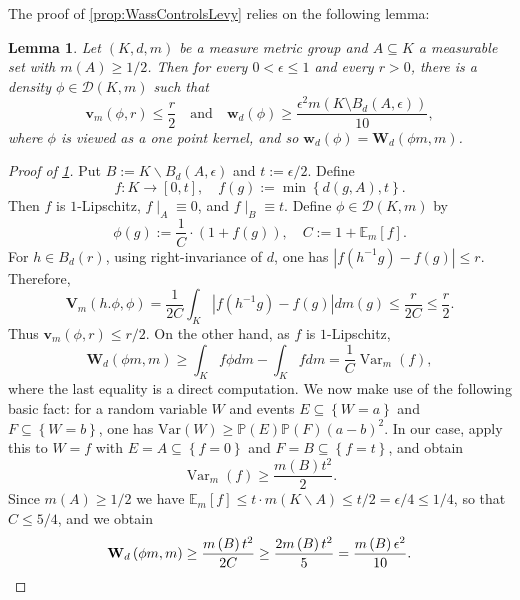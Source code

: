 \documentclass{amsart}
\providecommand{\lemmaname}{Lemma}
\numberwithin{equation}{subsection}
\theoremstyle{plain}
\newtheorem{lem}[lem]{\protect\lemmaname}
\theoremstyle{definition}
\theoremstyle{plain}
\begin{document}
The proof of \cref{prop:WassControlsLevy} relies on the following lemma:

\begin{lem}\label{lem:setToDensity}
Let \(\left(K,d,m\right)\) be a measure metric group and \(A\subseteq K\) a measurable set with \(m\left(A\right)\geq 1/2\). Then for every \(0<\epsilon\leq1\) and every \(r>0\), there is a density \(\phi\in\mathcal{D}\left(K,m\right)\) such that
\[\mathbf{v}_{m}\left(\phi,r\right)\leq\frac{r}{2}\quad\text{and}\quad\mathbf{w}_{d}\left(\phi\right)\geq\frac{\epsilon^{2}m\left(K\setminus B_{d}\left(A,\epsilon\right)\right)}{10},\]
where \(\phi\) is viewed as a one point kernel, and so \(\mathbf{w}_{d}\left(\phi\right)=\mathbf{W}_{d}\left(\phi m,m\right)\).
\end{lem}

\begin{proof}[Proof of \cref{lem:setToDensity}]
Put \(B:=K\backslash B_{d}\left(A,\epsilon\right)\) and \(t:=\epsilon/2\). Define
\[f:K\to\left[0,t\right],\quad f\left(g\right):=\min\left\{d\left(g,A\right),t\right\}.\]
Then \(f\) is \(1\)-Lipschitz, \(f\mid_{A}\equiv0\), and \(f\mid_{B}\equiv t\). Define \(\phi\in\mathcal{D}\left(K,m\right)\) by
\[\phi\left(g\right):=\frac{1}{C}\cdot\left(1+f\left(g\right)\right),\quad C:=1+\mathbb{E}_{m}\left[f\right].\]
For \(h\in B_{d}\left(r\right)\), using right-invariance of \(d\), one has \(\left|f\left(h^{-1}g\right)-f\left(g\right)\right|\leq r\). Therefore,
\[\mathbf{V}_{m}\left(h.\phi,\phi\right)=\frac{1}{2C}\int_{K}\left|f\left(h^{-1}g\right)-f\left(g\right)\right|dm\left(g\right)\leq\frac{r}{2C}\leq\frac{r}{2}.\]
Thus \(\mathbf{v}_{m}\left(\phi,r\right)\leq r/2\). On the other hand, as \(f\) is \(1\)-Lipschitz,
\[\mathbf{W}_{d}\left(\phi m,m\right)\geq\int_{K}f\phi dm-\int_{K}fdm=\frac{1}{C}\operatorname{Var}_{m}\left(f\right),\]
where the last equality is a direct computation. We now make use of the following basic fact: for a random variable \(W\) and events \(E\subseteq\left\{W=a\right\}\) and \(F\subseteq\left\{W=b\right\}\), one has \(\mathrm{Var}\left(W\right)\geq\mathbb{P}\left(E\right)\mathbb{P}\left(F\right)\left(a-b\right)^{2}\). In our case, apply this to \(W=f\) with \(E=A\subseteq\left\{f=0\right\}\) and \(F=B\subseteq\left\{f=t\right\}\), and obtain
\[\operatorname{Var}_{m}\left(f\right)\geq\frac{m\left(B\right)t^{2}}{2}.\]
Since \(m\left(A\right)\geq 1/2\) we have \(\mathbb{E}_{m}\left[f\right]\leq t\cdot m\left(K\backslash A\right)\leq t/2=\epsilon/4\leq1/4\), so that \(C\leq 5/4\), and we obtain
\[\mathbf{W}_{d}\left(\phi m,m\right)\geq\frac{m\left(B\right)t^{2}}{2C}\geq\frac{2m\left(B\right)t^{2}}{5}=\frac{m\left(B\right)\epsilon^{2}}{10}.\qedhere\]
\end{proof}
\end{document}
